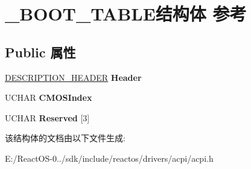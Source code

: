 \hypertarget{struct___b_o_o_t___t_a_b_l_e}{}\section{\+\_\+\+B\+O\+O\+T\+\_\+\+T\+A\+B\+L\+E结构体 参考}
\label{struct___b_o_o_t___t_a_b_l_e}
\subsection*{Public 属性}
\begin{DoxyCompactItemize}
\item 
\mbox{\label{struct___b_o_o_t___t_a_b_l_e_ab0a7bf6eceb1c00bc730925626387f48}} 
\hyperlink{struct___d_e_s_c_r_i_p_t_i_o_n___h_e_a_d_e_r}{D\+E\+S\+C\+R\+I\+P\+T\+I\+O\+N\+\_\+\+H\+E\+A\+D\+ER} {\bfseries Header}
\item 
\mbox{\label{struct___b_o_o_t___t_a_b_l_e_a206757fdc97c326b1a7ec3e5cb48d19b}} 
U\+C\+H\+AR {\bfseries C\+M\+O\+S\+Index}
\item 
\mbox{\label{struct___b_o_o_t___t_a_b_l_e_a58baebca4ac5cd49c14601eadf015d0e}} 
U\+C\+H\+AR {\bfseries Reserved} \mbox{[}3\mbox{]}
\end{DoxyCompactItemize}


该结构体的文档由以下文件生成\+:\begin{DoxyCompactItemize}
\item 
E\+:/\+React\+O\+S-\/0../sdk/include/reactos/drivers/acpi/acpi.\+h\end{DoxyCompactItemize}
